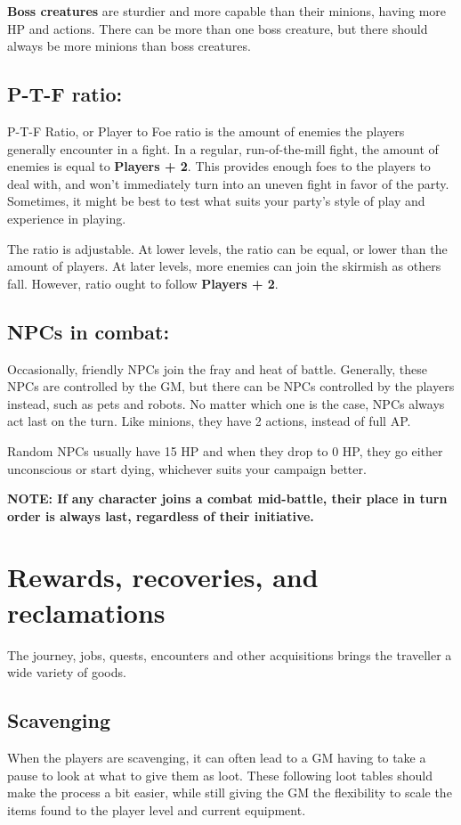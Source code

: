 \documentclass[11pt,a4paper,twocolumn]{book}
\begin{document}
    \textbf{Boss creatures} are sturdier and more capable than their minions, having more HP and actions. There can be more than one boss creature, but there should always be more minions than boss creatures. 
    
    \section*{P-T-F ratio:}
    
    P-T-F Ratio, or Player to Foe ratio is the amount of enemies the players generally encounter in a fight. In a regular, run-of-the-mill fight, the amount of enemies is equal to  \textbf{Players + 2}. This provides enough foes to the players to deal with, and won't immediately turn into an uneven fight in favor of the party. Sometimes, it might be best to test what suits your party's style of play and experience in playing.
    
    The ratio is adjustable. At lower levels, the ratio can be equal, or lower than the amount of players. At later levels, more enemies can join the skirmish as others fall. However, ratio ought to follow  \textbf{Players + 2}.
    
    \section*{NPCs in combat:}
    
    Occasionally, friendly NPCs join the fray and heat of battle. Generally, these NPCs are controlled by the GM, but there can be NPCs controlled by the players instead, such as pets and robots. No matter which one is the case, NPCs always act last on the turn. Like minions, they have 2 actions, instead of full AP.
    
    Random NPCs usually have 15 HP and when they drop to 0 HP, they go either unconscious or start dying, whichever suits your campaign better.
    
      \textbf{NOTE: If any character joins a combat mid-battle, their place in turn order is always last, regardless of their initiative.}
    
    \chapter{Rewards, recoveries, and reclamations}
    The journey, jobs, quests, encounters and other acquisitions brings the traveller a wide variety of goods.
    
    \section*{Scavenging}
    When the players are scavenging, it can often lead to a GM having to take a pause to look at what to give them as loot. These following loot tables should make the process a bit easier, while still giving the GM the flexibility to scale the items found to the player level and current equipment. 
    
\end{document}

